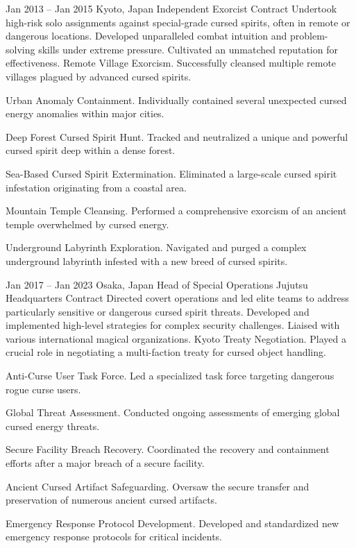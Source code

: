 \documentclass[roman,11pt]{moderncv}
\begin{document}
\cventry
{Jan 2013 -- Jan 2015}
{Kyoto, Japan}
{Independent Exorcist}
{}
{Contract}
{Undertook high-risk solo assignments against special-grade cursed spirits, often in remote or dangerous locations. Developed unparalleled combat intuition and problem-solving skills under extreme pressure. Cultivated an unmatched reputation for effectiveness.}
\cvlistitem
{Remote Village Exorcism. Successfully cleansed multiple remote villages plagued by advanced cursed spirits.}

\cvlistitem
{Urban Anomaly Containment. Individually contained several unexpected cursed energy anomalies within major cities.}

\cvlistitem
{Deep Forest Cursed Spirit Hunt. Tracked and neutralized a unique and powerful cursed spirit deep within a dense forest.}

\cvlistitem
{Sea-Based Cursed Spirit Extermination. Eliminated a large-scale cursed spirit infestation originating from a coastal area.}

\cvlistitem
{Mountain Temple Cleansing. Performed a comprehensive exorcism of an ancient temple overwhelmed by cursed energy.}

\cvlistitem
{Underground Labyrinth Exploration. Navigated and purged a complex underground labyrinth infested with a new breed of cursed spirits.}

\cventry
{Jan 2017 -- Jan 2023}
{Osaka, Japan}
{Head of Special Operations}
{Jujutsu Headquarters}
{Contract}
{Directed covert operations and led elite teams to address particularly sensitive or dangerous cursed spirit threats. Developed and implemented high-level strategies for complex security challenges. Liaised with various international magical organizations.}
\cvlistitem
{Kyoto Treaty Negotiation. Played a crucial role in negotiating a multi-faction treaty for cursed object handling.}

\cvlistitem
{Anti-Curse User Task Force. Led a specialized task force targeting dangerous rogue curse users.}

\cvlistitem
{Global Threat Assessment. Conducted ongoing assessments of emerging global cursed energy threats.}

\cvlistitem
{Secure Facility Breach Recovery. Coordinated the recovery and containment efforts after a major breach of a secure facility.}

\cvlistitem
{Ancient Cursed Artifact Safeguarding. Oversaw the secure transfer and preservation of numerous ancient cursed artifacts.}

\cvlistitem
{Emergency Response Protocol Development. Developed and standardized new emergency response protocols for critical incidents.}
\end{document}
